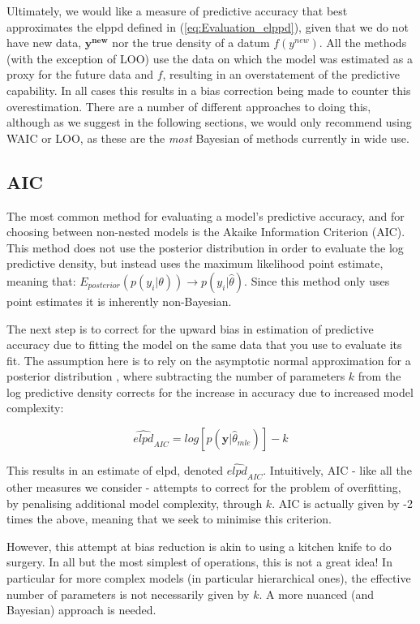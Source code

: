 \documentclass[11pt,fullpage]{book}
\begin{document}
Ultimately, we would like a measure of predictive accuracy that best approximates the elppd defined in (\ref{eq:Evaluation_elppd}), given that we do not have new data, $\boldsymbol{y^{new}}$ nor the true density of a datum $f(y^{new})$. All the methods (with the exception of LOO) use the data on which the model was estimated as a proxy for the future data and $f$, resulting in an overstatement of the predictive capability. In all cases this results in a bias correction being made to counter this overestimation. There are a number of different approaches to doing this, although as we suggest in the following sections, we would only recommend using WAIC or LOO, as these are the \textit{most} Bayesian of methods currently in wide use.

\subsection{AIC}
The most common method for evaluating a model's predictive accuracy, and for choosing between non-nested models is the Akaike Information Criterion (AIC). This method does not use the posterior distribution in order to evaluate the log predictive density, but instead uses the maximum likelihood point estimate, meaning that: $E_{posterior}(p(y_i|\theta))\rightarrow p(y_i|\hat{\theta})$. Since this method only uses point estimates it is inherently non-Bayesian.

The next step is to correct for the upward bias in estimation of predictive accuracy due to fitting the model on the same data that you use to evaluate its fit. The assumption here is to rely on the asymptotic normal approximation for a posterior distribution \cite{gelman2013bayesian}, where subtracting the number of parameters $k$ from the log predictive density corrects for the increase in accuracy due to increased model complexity:

\begin{equation}
\widehat{elpd}_{AIC} = log\left[p(\boldsymbol{y}|\hat{\theta}_{mle})\right] - k
\end{equation}

This results in an estimate of elpd, denoted $\widehat{elpd}_{AIC}$. Intuitively, AIC - like all the other measures we consider - attempts to correct for the problem of overfitting, by penalising additional model complexity, through $k$. AIC is actually given by -2 times the above, meaning that we seek to minimise this criterion.

However, this attempt at bias reduction is akin to using a kitchen knife to do surgery. In all but the most simplest of operations, this is not a great idea! In particular for more complex models (in particular hierarchical ones), the effective number of parameters is not necessarily given by $k$. A more nuanced (and Bayesian) approach is needed.
\end{document}
